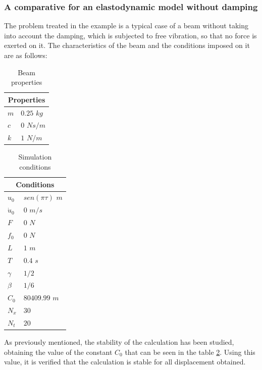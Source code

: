 \documentclass[a4paper, 10pt]{article}
\begin{document}
\subsubsection{A comparative for an elastodynamic model without damping}

The problem treated in the example is a typical case of a beam without taking into account the damping, which is subjected to free vibration, so that no force is exerted on it. The characteristics of the beam and the conditions imposed on it are as follows:

\begin{table}[htb]
\centering
\caption{Beam properties}
\label{tabla:propiedades}
\begin{tabular}{|l|l|}
\hline
\multicolumn{2}{|c|}{Properties} \\ \hline
$m$ & $0.25$ $kg$ \\
$c$ & $0$ $N s/m$\\
$k$ & $1$ $N/m$\\
\hline
\end{tabular}
\end{table}


\begin{table}[htb]
\centering
\caption{Simulation conditions}
\label{tabla:condiciones}
\begin{tabular}{|l|l|}
\hline
\multicolumn{2}{|c|}{Conditions} \\ \hline
$u_0$ & $sen(\pi \tau)$ $m$ \\
$\dot{u}_0$ & $0$ $m/s$\\
$F$ & $0$ $N$\\
$f_0$ & $0$ $N$\\
$L$ & $1$ $m$\\
$T$ & $0.4$ $s$\\
$\gamma$ & $1/2$\\
$\beta$ & $1/6$ \\
$C_0$ & $80409.99$ $m$ \\
$N_x$ & $30$  \\
$N_t$ & $20$  \\
\hline
\end{tabular}
\end{table}

As previously mentioned, the stability of the calculation has been studied, obtaining the value of the constant $C_0$ that can be seen in the table \ref{tabla:condiciones}. Using this value, it is verified that the calculation is stable for all displacement obtained.\\
\end{document}
